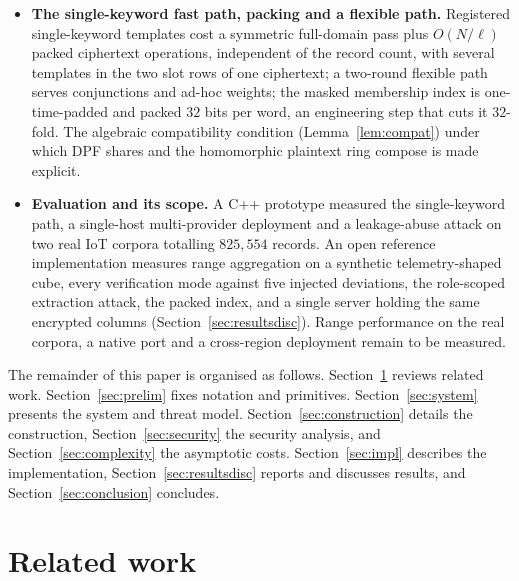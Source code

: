 \documentclass[a4paper,fleqn]{cas-sc}
\begin{document}
\begin{itemize}
\item \textbf{The single-keyword fast path, packing and a flexible path.}
Registered single-keyword templates cost a symmetric full-domain pass plus
$O(N/\ell)$ packed ciphertext operations, independent of the record count, with
several templates in the two slot rows of one ciphertext; a two-round flexible
path serves conjunctions and ad-hoc weights; the masked membership index is
one-time-padded and packed $32$ bits per word, an engineering step that cuts it
$32$-fold. The algebraic compatibility condition (Lemma~\ref{lem:compat}) under
which DPF shares and the homomorphic plaintext ring compose is made explicit.

\item \textbf{Evaluation and its scope.} A C++ prototype measured the
single-keyword path, a single-host multi-provider deployment and a
leakage-abuse attack on two real IoT corpora totalling $825{,}554$ records.
An open reference implementation measures range aggregation on a synthetic
telemetry-shaped cube, every verification mode against five injected
deviations, the role-scoped extraction attack, the packed index, and a single
server holding the same encrypted columns (Section~\ref{sec:resultsdisc}).
Range performance on the real corpora, a native port and a cross-region
deployment remain to be measured.
\end{itemize}

The remainder of this paper is organised as follows.
Section~\ref{sec:related} reviews related work. Section~\ref{sec:prelim} fixes
notation and primitives. Section~\ref{sec:system} presents the system and
threat model. Section~\ref{sec:construction} details
the construction, Section~\ref{sec:security} the security analysis, and
Section~\ref{sec:complexity} the asymptotic costs. Section~\ref{sec:impl}
describes the implementation, Section~\ref{sec:resultsdisc} reports and
discusses results, and Section~\ref{sec:conclusion} concludes.

\section{Related work}
\label{sec:related}
\end{document}

